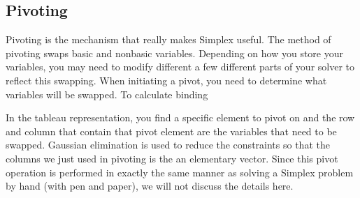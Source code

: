 \subsection{Pivoting}
Pivoting is the mechanism that really makes Simplex useful.
The method of pivoting swaps basic and nonbasic variables.
Depending on how you store your variables, you may need to modify different a few different parts of your solver to reflect this swapping.
When initiating a pivot, you need to determine what variables will be swapped.
To calculate binding 

In the tableau representation, you find a specific element to pivot on and the row and column that contain that pivot element are the variables that need to be swapped.
Gaussian elimination is used to reduce the constraints so that the columns we just used in pivoting is the an elementary vector.
Since this pivot operation is performed in exactly the same manner as solving a Simplex problem by hand (with pen and paper), we will not discuss the details here.

